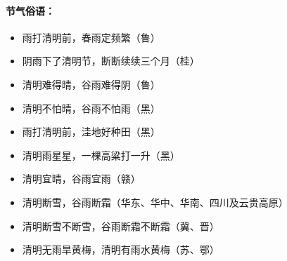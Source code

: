 \paragraph{节气俗语：}
\begin{itemize}
\item
雨打清明前，春雨定频繁（鲁）
\item 
阴雨下了清明节，断断续续三个月（桂）
\item
清明难得晴，谷雨难得阴（鲁）
\item   
清明不怕晴，谷雨不怕雨（黑）
\item 
雨打清明前，洼地好种田（黑）
\item 
清明雨星星，一棵高粱打一升（黑）
\item 
清明宜晴，谷雨宜雨（赣）
\item 
清明断雪，谷雨断霜（华东、华中、华南、四川及云贵高原）
\item 
清明断雪不断雪，谷雨断霜不断霜（冀、晋）
\item 
清明无雨旱黄梅，清明有雨水黄梅（苏、鄂） 
\end{itemize}
